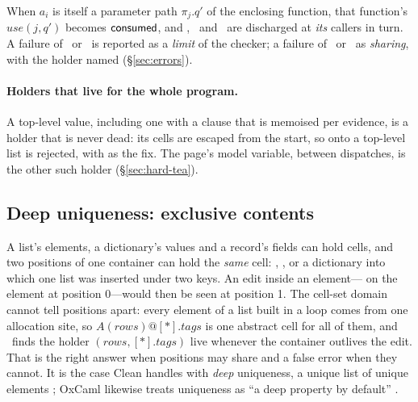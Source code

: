 When $a_i$ is itself a parameter path $\pi_j.q'$ of the enclosing function, that function's
$\mathit{use}(j, q')$ becomes $\mathsf{consumed}$, and \Unescaped, \Dead\ and \Disjoint\ are discharged at
\emph{its} callers in turn. A failure of \Known\ or \Unescaped\ is reported as a \emph{limit} of the
checker; a failure of \Dead\ or \Disjoint\ as \emph{sharing}, with the holder named
(\S\ref{sec:errors}).

\paragraph{Holders that live for the whole program.} A top-level value, including one with a
 clause that is memoised per evidence, is a holder that is never dead: its cells are
escaped from the start, so \code{[ x, …defaults ]} onto a top-level list is rejected, with
 as the fix. The page's model variable, between dispatches, is the other such holder
(\S\ref{sec:hard-tea}).

\subsection{Deep uniqueness: exclusive contents}
\label{sec:model-excl}

A list's elements, a dictionary's values and a record's fields can hold cells, and two positions of
one container can hold the \emph{same} cell: \code{[ r, r ]}, , or a dictionary
into which one list was inserted under two keys. An edit inside an element---
 on the element at position 0---would then be seen at
position 1. The cell-set domain cannot tell positions apart: every element of a list built in a loop
comes from one allocation site, so $A(\mathit{rows})@[\ast].\mathit{tags}$ is one abstract cell for
all of them, and \Dead\ finds the holder $(\mathit{rows}, [\ast].\mathit{tags})$ live whenever the
container outlives the edit. That is the right answer when positions may share and a false error
when they cannot. It is the case Clean handles with \emph{deep} uniqueness, a unique list of unique
elements \citep[\S9.2]{plasmeijer2011clean}; OxCaml likewise treats uniqueness as ``a deep property
by default'' \citep[\S2.1]{lorenzen2024oxidizing}.


